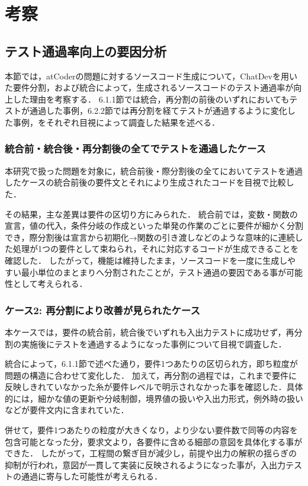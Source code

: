 \documentclass[submit,techrep,noauthor]{ipsj}
\begin{document}
\section{考察}
\label{sec:discussion}
\subsection{テスト通過率向上の要因分析}
本節では，atCoderの問題に対するソースコード生成について，ChatDevを用いた要件分割，および統合によって，生成されるソースコードのテスト通過率が向上した理由を考察する．
6.1.1節では統合，再分割の前後のいずれにおいてもテストが通過した事例，6.2.2節では再分割を経てテストが通過するように変化した事例，をそれぞれ目視によって調査した結果を述べる．

\subsubsection{統合前・統合後・再分割後の全てでテストを通過したケース}
本研究で扱った問題を対象に，統合前後・際分割後の全てにおいてテストを通過したケースの統合前後の要件文とそれにより生成されたコードを目視で比較した．

その結果，主な差異は要件の区切り方にみられた．
統合前では，変数・関数の宣言，値の代入，条件分岐の作成といった単発の作業のごとに要件が細かく分割でき，際分割後は宣言から初期化→関数の引き渡しなどのような意味的に連続した処理が1つの要件として束ねられ，それに対応するコードが生成できることを確認した．
したがって，機能は維持したまま，ソースコードを一度に生成しやすい最小単位のまとまりへ分割されたことが，テスト通過の要因である事が可能性として考えられる．

\subsubsection{ケース2: 再分割により改善が見られたケース}
本ケースでは，要件の統合前，統合後でいずれも入出力テストに成功せず，再分割の実施後にテストを通過するようになった事例について目視で調査した．

統合によって，6.1.1節で述べた通り，要件1つあたりの区切られ方，即ち粒度が問題の構造に合わせて変化した．
加えて，再分割の過程では，これまで要件に反映しきれていなかった糸が要件レベルで明示されなかった事を確認した．具体的には，細かな値の更新や分岐制御，境界値の扱いや入出力形式，例外時の扱いなどが要件文内に含まれていた．

併せて，要件1つあたりの粒度が大きくなり，より少ない要件数で同等の内容を包含可能となった分，要求文より，各要件に含める細部の意図を具体化する事ができた．
したがって，工程間の繋ぎ目が減少し，前提や出力の解釈の揺らぎの抑制が行われ，意図が一貫して実装に反映されるようになった事が，入出力テストの通過に寄与した可能性が考えられる．
\end{document}
